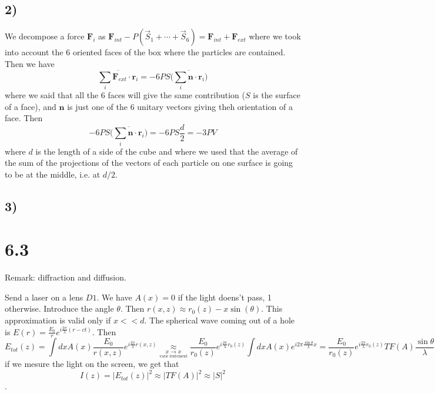 \documentclass[10pt,a4paper]{book}
\begin{document}
\subsection*{2)}

We decompose a force $\mathbf{F}_i$ as $\mathbf{F}_{int}-P(\vec{S}_1+\cdots+\vec{S}_6)=\mathbf{F}_{int}+\mathbf{F}_{ext}$ where we took into account the 6 oriented faces of the box where the particles are contained. Then we have
$$\overline{\sum_i\mathbf{F}_{ext}\cdot\mathbf{r}_i}=-6PS\bigg(\overline{\sum_i \mathbf{n}\cdot \mathbf{r}_i}\bigg)$$
where we said that all the 6 faces will give the same contribution ($S$ is the surface of a face), and $\mathbf{n}$ is just one of the 6 unitary vectors giving theh orientation of a face.
Then 
$$-6PS\bigg(\overline{\sum_i \mathbf{n}\cdot \mathbf{r}_i}\bigg)=-6PS\frac{d}{2}=-3PV$$
where $d$ is the length of a side of the cube and where we used that the average of the sum of the projections of the vectors of each particle on one surface is going to be at the middle, i.e. at $d/2$.

\subsection*{3)}











\section*{6.3}




Remark: diffraction and diffusion.

Send a laser on a lens $D1$. We have $A(x)=0$ if the light doens't pass, 1 otherwise. Introduce the angle $\theta$. Then $r(x,z)\approx r_0(z)-x\sin(\theta)$. This approximation is valid only if $x<<d$. The spherical wave coming out of a hole is $E(r)=\frac{E_0}{r}e^{i\frac{2\pi}{\lambda}(r-ct)}$. Then $$E_{tot}(z)=\int dxA(x)\frac{E_0}{r(x,z)}e^{i\frac{2\pi}{\lambda}r(x,z)}\underset{\underset{\text{varie lentement}}{x\to x}}{\approx} \frac{E_0}{r_0(z)}e^{i\frac{2\pi}{\lambda}r_0(z)}\int dxA(x)e^{i2\pi\frac{\sin\theta}{\lambda}x}=\frac{E_0}{r_0(z)}e^{i\frac{2\pi}{\lambda}r_0(z)}TF(A)\frac{\sin\theta}{\lambda}$$
if we mesure the light on the screen, we get that
$$I(z)=|E_{tot}(z)|^2\approx |TF(A)|^2\approx |S|^2$$.
\end{document}
